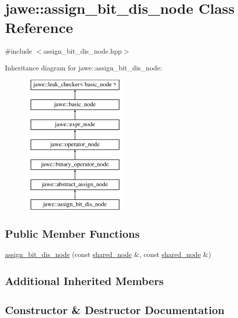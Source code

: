 \hypertarget{classjawe_1_1assign__bit__dis__node}{}\section{jawe\+:\+:assign\+\_\+bit\+\_\+dis\+\_\+node Class Reference}
\label{classjawe_1_1assign__bit__dis__node}


{\ttfamily \#include $<$assign\+\_\+bit\+\_\+dis\+\_\+node.\+hpp$>$}

Inheritance diagram for jawe\+:\+:assign\+\_\+bit\+\_\+dis\+\_\+node\+:\begin{figure}[H]
\begin{center}
\leavevmode
\includegraphics[height=7.000000cm]{classjawe_1_1assign__bit__dis__node}
\end{center}
\end{figure}
\subsection*{Public Member Functions}
\begin{DoxyCompactItemize}
\item 
\hyperlink{classjawe_1_1assign__bit__dis__node_afd0769ee76fe37456202382e3eb5537c}{assign\+\_\+bit\+\_\+dis\+\_\+node} (const \hyperlink{namespacejawe_a3f307481d921b6cbb50cc8511fc2b544}{shared\+\_\+node} \&, const \hyperlink{namespacejawe_a3f307481d921b6cbb50cc8511fc2b544}{shared\+\_\+node} \&)
\end{DoxyCompactItemize}
\subsection*{Additional Inherited Members}


\subsection{Constructor \& Destructor Documentation}
\mbox{\label{classjawe_1_1assign__bit__dis__node_afd0769ee76fe37456202382e3eb5537c}} 
